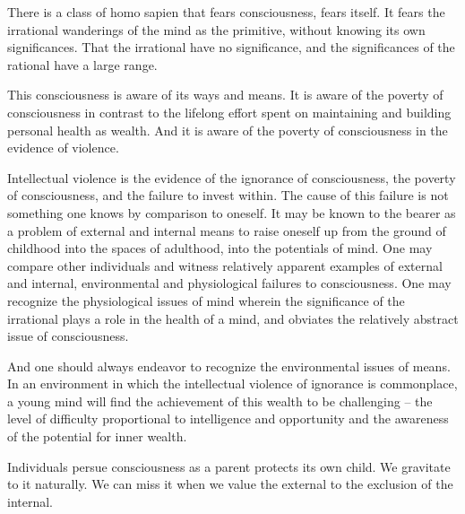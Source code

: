 

There is a class of homo sapien that fears consciousness, fears
itself.  It fears the irrational wanderings of the mind as the
primitive, without knowing its own significances.  That the irrational
have no significance, and the significances of the rational have a
large range.

This consciousness is aware of its ways and means.  It is aware of the
poverty of consciousness in contrast to the lifelong effort spent on
maintaining and building personal health as wealth.  And it is aware
of the poverty of consciousness in the evidence of violence.  

Intellectual violence is the evidence of the ignorance of
consciousness, the poverty of consciousness, and the failure to invest
within.  The cause of this failure is not something one knows by
comparison to oneself.  It may be known to the bearer as a problem of
external and internal means to raise oneself up from the ground of
childhood into the spaces of adulthood, into the potentials of mind.
One may compare other individuals and witness relatively apparent
examples of external and internal, environmental and physiological
failures to consciousness.  One may recognize the physiological issues
of mind wherein the significance of the irrational plays a role in the
health of a mind, and obviates the relatively abstract issue of
consciousness.

And one should always endeavor to recognize the environmental issues
of means.  In an environment in which the intellectual violence of
ignorance is commonplace, a young mind will find the achievement of
this wealth to be challenging -- the level of difficulty proportional
to intelligence and opportunity and the awareness of the potential for
inner wealth.  

Individuals persue consciousness as a parent protects its own child.
We gravitate to it naturally.  We can miss it when we value the
external to the exclusion of the internal.

\bye
